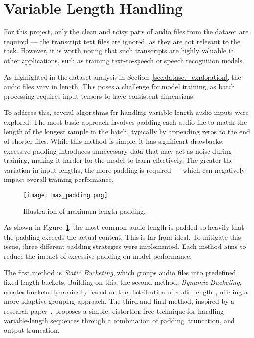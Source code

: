 \section{Variable Length Handling}
\label{sec:variable_length_handling}

For this project, only the clean and noisy pairs of audio files from the dataset are required — the transcript text files are ignored, as they are not relevant to the task. However, it is worth noting that such transcripts are highly valuable in other applications, such as training text-to-speech or speech recognition models.

As highlighted in the dataset analysis in Section~\ref{sec:dataset_exploration}, the audio files vary in length. This poses a challenge for model training, as batch processing requires input tensors to have consistent dimensions.

To address this, several algorithms for handling variable-length audio inputs were explored. The most basic approach involves padding each audio file to match the length of the longest sample in the batch, typically by appending zeros to the end of shorter files. While this method is simple, it has significant drawbacks: excessive padding introduces unnecessary data that may act as noise during training, making it harder for the model to learn effectively. The greater the variation in input lengths, the more padding is required — which can negatively impact overall training performance.

\begin{figure}[h]
    \centering
    \texttt{[image: max\_padding.png]}
    \caption{\label{fig:max_padding}Illustration of maximum-length padding.}
\end{figure}

As shown in Figure~\ref{fig:max_padding}, the most common audio length is padded so heavily that the padding exceeds the actual content. This is far from ideal. To mitigate this issue, three different padding strategies were implemented. Each method aims to reduce the impact of excessive padding on model performance.

The first method is \textit{Static Bucketing}, which groups audio files into predefined fixed-length buckets. Building on this, the second method, \textit{Dynamic Bucketing}, creates buckets dynamically based on the distribution of audio lengths, offering a more adaptive grouping approach. The third and final method, inspired by a research paper~\cite{yoon2020pto}, proposes a simple, distortion-free technique for handling variable-length sequences through a combination of padding, truncation, and output truncation.

